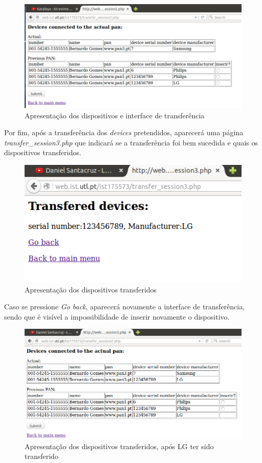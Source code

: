 \documentclass[a4paper]{article}
\begin{document}
\begin{figure}[ht!]
\centering
\includegraphics[scale=0.3]{transfer2.png}
\caption{Apresentação dos dispositivos e interface de transferência}
\end{figure}

Por fim, após a transferência dos \textit{devices} pretendidos, aparecerá uma página \textit{transfer\_session3.php} que indicará se a transferência foi bem sucedida e quais os dispositivos transferidos.

 \begin{figure}[ht!]
\centering
\includegraphics[scale=0.53]{transfer3.png}
\caption{Apresentação dos dispositivos transferidos}
\end{figure}

Caso se pressione \textit{Go back}, aparecerá novamente a interface de transferência, sendo que é visível a impossibilidade de inserir novamente o dispositivo.

 \begin{figure}[ht!]
\centering
\includegraphics[scale=0.4]{transfer4.png}
\caption{Apresentação dos dispositivos transferidos, após LG ter sido transferido}
\end{figure}
\end{document}
